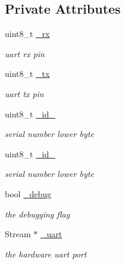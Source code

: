 \subsection*{Private Attributes}
\begin{DoxyCompactItemize}
\item 
\mbox{\label{classsds011_a65876aa058bdb6997257dac48757aa76}} 
uint8\+\_\+t \mbox{\hyperlink{classsds011_a65876aa058bdb6997257dac48757aa76}{\+\_\+rx}}
\begin{DoxyCompactList}\small\item\em uart rx pin \end{DoxyCompactList}\item 
\mbox{\label{classsds011_af5352382f195b929e74567224f6d65c3}} 
uint8\+\_\+t \mbox{\hyperlink{classsds011_af5352382f195b929e74567224f6d65c3}{\+\_\+tx}}
\begin{DoxyCompactList}\small\item\em uart tx pin \end{DoxyCompactList}\item 
\mbox{\label{classsds011_af6a7bd17192b5ec971c24380263a7004}} 
uint8\+\_\+t \mbox{\hyperlink{classsds011_af6a7bd17192b5ec971c24380263a7004}{\+\_\+id\+\_}}
\begin{DoxyCompactList}\small\item\em serial number lower byte \end{DoxyCompactList}\item 
\mbox{\label{classsds011_a06eef5f34d3b50088080446f0e16604e}} 
uint8\+\_\+t \mbox{\hyperlink{classsds011_a06eef5f34d3b50088080446f0e16604e}{\+\_\+id\+\_}}
\begin{DoxyCompactList}\small\item\em serial number lower byte \end{DoxyCompactList}\item 
\mbox{\label{classsds011_a4b5c02bd7c5a65b942893faf97ec9547}} 
bool \mbox{\hyperlink{classsds011_a4b5c02bd7c5a65b942893faf97ec9547}{\+\_\+debug}}
\begin{DoxyCompactList}\small\item\em the debugging flag \end{DoxyCompactList}\item 
\mbox{\label{classsds011_adbf3f2bce299fd52c3dbca71136a35f6}} 
Stream $\ast$ \mbox{\hyperlink{classsds011_adbf3f2bce299fd52c3dbca71136a35f6}{\+\_\+uart}}
\begin{DoxyCompactList}\small\item\em the hardware uart port \end{DoxyCompactList}\end{DoxyCompactItemize}


